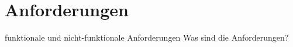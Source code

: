 \chapter{Anforderungen}
\label{cha:anforderungen}




funktionale und nicht-funktionale Anforderungen
Was sind die Anforderungen?\\

